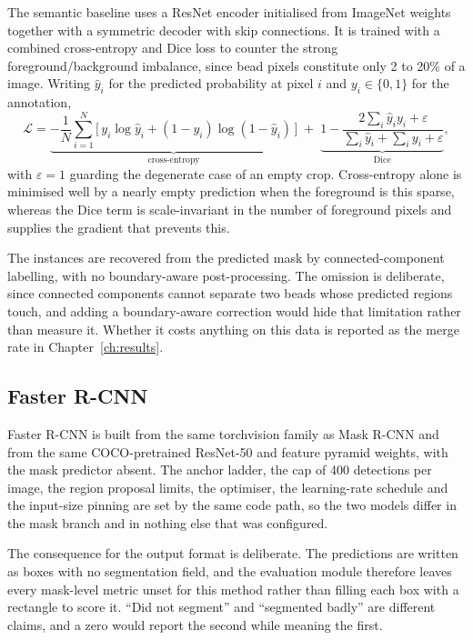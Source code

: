 The semantic baseline uses a ResNet encoder initialised from ImageNet weights
together with a symmetric decoder with skip connections. It is trained with a
combined cross-entropy and Dice loss to counter the strong
foreground/background imbalance, since bead pixels constitute only 2 to 20\% of a
image. Writing $\hat{y}_i$ for the predicted probability at pixel $i$ and
$y_i \in \{0,1\}$ for the annotation,
%
\begin{equation}
    \mathcal{L} =
    \underbrace{-\frac{1}{N}\sum_{i=1}^{N}
      \bigl[\, y_i \log \hat{y}_i + (1 - y_i) \log (1 - \hat{y}_i) \,\bigr]}
      _{\textstyle \text{cross-entropy}}
    \;+\;
    \underbrace{1 - \frac{2 \sum_i \hat{y}_i y_i + \varepsilon}
                        {\sum_i \hat{y}_i + \sum_i y_i + \varepsilon}}
      _{\textstyle \text{Dice}},
    \label{eq:dice_bce}
\end{equation}
%
with $\varepsilon = 1$ guarding the degenerate case of an empty crop.
Cross-entropy alone is minimised well by a nearly empty prediction when the
foreground is this sparse, whereas the Dice term is scale-invariant in the number of
foreground pixels and supplies the gradient that prevents this.

The instances are recovered from the predicted mask by connected-component
labelling, with no boundary-aware post-processing. The omission is deliberate, since
connected components cannot separate two beads whose predicted regions touch, and
adding a boundary-aware correction would hide that limitation rather than measure
it. Whether it costs anything on this data is reported as the merge rate in
Chapter~\ref{ch:results}.

\subsection{Faster R-CNN}

Faster R-CNN is built from the same torchvision family as Mask R-CNN and from the
same COCO-pretrained ResNet-50 and feature pyramid weights, with the mask predictor
absent. The anchor ladder, the cap of 400 detections per image, the region proposal limits,
the optimiser, the learning-rate schedule and the input-size pinning are set by the
same code path, so the two models differ in the mask branch and in nothing else
that was configured.

The consequence for the output format is deliberate. The predictions are written as
boxes with no segmentation field, and the evaluation module therefore leaves every
mask-level metric unset for this method rather than filling each box with a
rectangle to score it. ``Did not segment'' and ``segmented badly'' are
different claims, and a zero would report the second while meaning the first.

